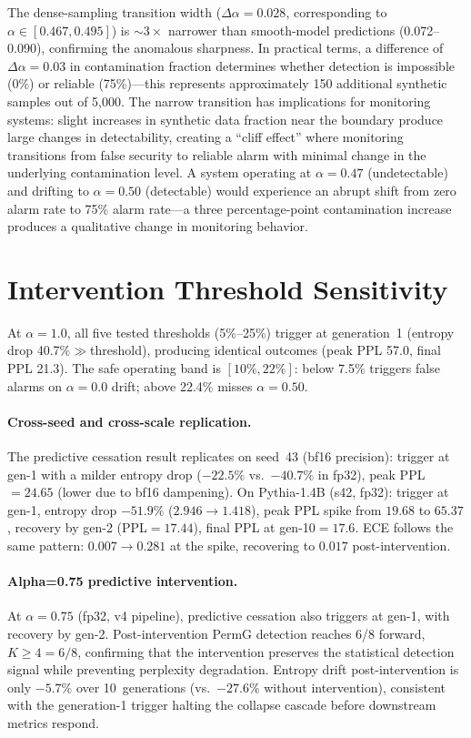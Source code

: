 The dense-sampling transition width ($\Delta\alpha{=}0.028$, corresponding to $\alpha \in [0.467, 0.495]$) is ${\sim}3{\times}$ narrower than smooth-model predictions (0.072--0.090), confirming the anomalous sharpness.
In practical terms, a difference of $\Delta\alpha{=}0.03$ in contamination fraction determines whether detection is impossible (0\%) or reliable (75\%)---this represents approximately 150 additional synthetic samples out of 5{,}000.
The narrow transition has implications for monitoring systems: slight increases in synthetic data fraction near the boundary produce large changes in detectability, creating a ``cliff effect'' where monitoring transitions from false security to reliable alarm with minimal change in the underlying contamination level.
A system operating at $\alpha{=}0.47$ (undetectable) and drifting to $\alpha{=}0.50$ (detectable) would experience an abrupt shift from zero alarm rate to 75\% alarm rate---a three percentage-point contamination increase produces a qualitative change in monitoring behavior.

\section{Intervention Threshold Sensitivity}
\label{app:intervention_sensitivity}

At $\alpha{=}1.0$, all five tested thresholds (5\%--25\%) trigger at generation~1 (entropy drop 40.7\%$\gg$threshold), producing identical outcomes (peak PPL 57.0, final PPL 21.3).
The safe operating band is $[10\%, 22\%]$: below 7.5\% triggers false alarms on $\alpha{=}0.0$ drift; above 22.4\% misses $\alpha{=}0.50$.

\paragraph{Cross-seed and cross-scale replication.}
The predictive cessation result replicates on seed~43 (bf16 precision): trigger at gen-1 with a milder entropy drop ($-22.5\%$ vs.\ $-40.7\%$ in fp32), peak PPL${=}24.65$ (lower due to bf16 dampening).
On Pythia-1.4B (s42, fp32): trigger at gen-1, entropy drop $-51.9\%$ ($2.946 \to 1.418$), peak PPL spike from $19.68$ to $65.37$, recovery by gen-2 (PPL${=}17.44$), final PPL at gen-10${=}17.6$.
ECE follows the same pattern: $0.007 \to 0.281$ at the spike, recovering to $0.017$ post-intervention.

\paragraph{Alpha=0.75 predictive intervention.}
At $\alpha{=}0.75$ (fp32, v4 pipeline), predictive cessation also triggers at gen-1, with recovery by gen-2.
Post-intervention PermG detection reaches 6/8 forward, $K{\geq}4{=}6/8$, confirming that the intervention preserves the statistical detection signal while preventing perplexity degradation.
Entropy drift post-intervention is only $-5.7\%$ over 10~generations (vs.\ $-27.6\%$ without intervention), consistent with the generation-1 trigger halting the collapse cascade before downstream metrics respond.

